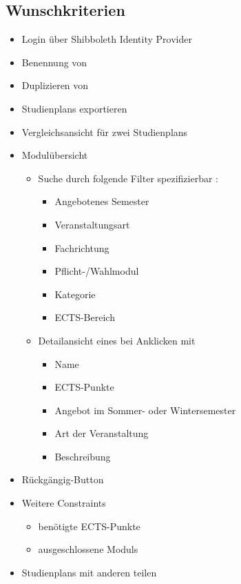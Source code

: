 \subsection{Wunschkriterien}
\label{subsec:project_goals-wunschkriterien}
\begin{itemize}[nosep]
	\item  Login über \gls{Shibboleth Identity Provider}	
	\item Benennung von 
	\item Duplizieren von 
	\item \glspl{Studienplan} exportieren
	\item Vergleichsansicht für zwei \glspl{Studienplan}
	\item Modulübersicht
	\begin{itemize}[nosep]	
		\item Suche durch folgende Filter spezifizierbar : 
		\begin{itemize}[nosep]
			\item Angebotenes Semester
			\item Veranstaltungsart
			\item Fachrichtung
			\item Pflicht-/Wahlmodul
			\item Kategorie
			\item ECTS-Bereich
		\end{itemize}
		\item Detailansicht eines  bei Anklicken mit
		\begin{itemize}[nosep]
			\item Name
			\item \gls{ECTS-Punkte}
			\item Angebot im Sommer- oder Wintersemester
			\item Art der Veranstaltung	
			\item Beschreibung
		\end{itemize}
	\end{itemize}
	\item Rückgängig-Button
	\item Weitere \glspl{Constraint}
	\begin{itemize}[nosep]
		\item benötigte \gls{ECTS-Punkte}
		\item ausgeschlossene \glspl{Modul}
	\end{itemize}
	\item \glspl{Studienplan} mit anderen  teilen
\end{itemize}
